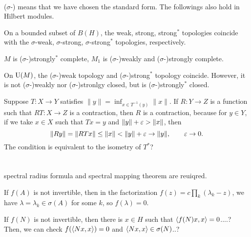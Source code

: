 \documentclass{../../large}
\begin{document}
\begin{prb}[]
\,

($\sigma$-) means that we have chosen the standard form.
The followings also hold in Hilbert modules.
\begin{parts}
\item On a bounded subset of $B(H)$, the weak, strong, strong$^*$ topologies coincide with the $\sigma$-weak, $\sigma$-strong, $\sigma$-strong$^*$ topologies, respectively.
\item $M$ is ($\sigma$-)strongly$^*$ complete, $M_1$ is ($\sigma$-)weakly and ($\sigma$-)strongly complete.
\item On $\mathrm{U}(M)$, the ($\sigma$-)weak topology and ($\sigma$-)strong$^*$ topology coincide. However, it is not ($\sigma$-)weakly nor ($\sigma$-)stronlgy closed, but is ($\sigma$-)strongly$^*$ closed.
\end{parts}
\end{prb}




Suppose $T:X\to Y$ satisfies $\|y\|=\inf_{x\in T^{-1}(y)}\|x\|$.
If $R:Y\to Z$ is a function such that $RT:X\to Z$ is a contraction, then $R$ is a contraction, because for $y\in Y$, if we take $x\in X$ such that $Tx=y$ and $\|y\|+\varepsilon>\|x\|$, then
\[\|Ry\|=\|RTx\|\le\|x\|<\|y\|+\varepsilon\to\|y\|,\qquad\varepsilon\to0.\]
The condition is equivalent to the isometry of $T^*$?


\section{}


spectral radius formula and spectral mapping theorem are reuiqred.






\begin{prb}
\end{prb}

\begin{prb}

If $f(A)$ is not invertible, then in the factorization $f(z)=c\prod_k(\lambda_k-z)$, we have $\lambda=\lambda_k\in\sigma(A)$ for some $k$, so $f(\lambda)=0$.

If $f(N)$ is not invertible, then there is $x\in H$ such that $\langle f(N)x,x\rangle=0$....?
Then, we can check $f(\langle Nx,x\rangle)=0$ and $\langle Nx,x\rangle\in\sigma(N)$..?






\end{prb}
\end{document}
